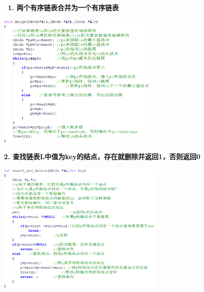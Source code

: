 \textbf{~{1. 两个有序链表合并为一个有序链表}}

\includegraphics[width=3.12500in,height=2.64583in]{png-jpeg-pics/27B36B8E0380485A33092BEA1B313D5E.png}

\textbf{{2. 查找链表L中值为key的结点，存在就删除并返回1，否则返回0}}

\includegraphics[width=3.22917in,height=2.56250in]{png-jpeg-pics/F334C274192073975B443739BACF94E9.png}
